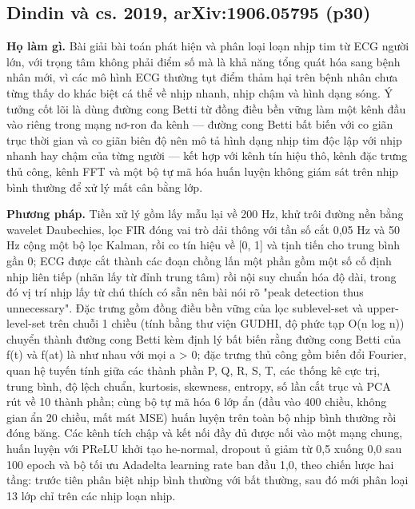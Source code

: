\documentclass[12pt,a4paper]{article}
\begin{document}
\subsection{Dindin và cs. 2019, arXiv:1906.05795 \normalfont\small (p30)}
\par\vspace{2pt}
\par\vspace{4pt}
\noindent \textbf{Họ làm gì.} Bài giải bài toán phát hiện và phân loại loạn nhịp tim từ ECG người lớn, với trọng tâm không phải điểm số mà là khả năng tổng quát hóa sang bệnh nhân mới, vì các mô hình ECG thường tụt điểm thảm hại trên bệnh nhân chưa từng thấy do khác biệt cá thể về nhịp nhanh, nhịp chậm và hình dạng sóng. Ý tưởng cốt lõi là dùng đường cong Betti từ đồng điều bền vững làm một kênh đầu vào riêng trong mạng nơ-ron đa kênh — đường cong Betti bất biến với co giãn trục thời gian và co giãn biên độ nên mô tả hình dạng nhịp tim độc lập với nhịp nhanh hay chậm của từng người — kết hợp với kênh tín hiệu thô, kênh đặc trưng thủ công, kênh FFT và một bộ tự mã hóa huấn luyện không giám sát trên nhịp bình thường để xử lý mất cân bằng lớp.\par\vspace{3pt}
\noindent \textbf{Phương pháp.} Tiền xử lý gồm lấy mẫu lại về 200 Hz, khử trôi đường nền bằng wavelet Daubechies, lọc FIR đóng vai trò dải thông với tần số cắt 0,05 Hz và 50 Hz cộng một bộ lọc Kalman, rồi co tín hiệu về [0, 1] và tịnh tiến cho trung bình gần 0; ECG được cắt thành các đoạn chồng lấn một phần gồm một số cố định nhịp liên tiếp (nhãn lấy từ đỉnh trung tâm) rồi nội suy chuẩn hóa độ dài, trong đó vị trí nhịp lấy từ chú thích có sẵn nên bài nói rõ "peak detection thus unnecessary". Đặc trưng gồm đồng điều bền vững của lọc sublevel-set và upper-level-set trên chuỗi 1 chiều (tính bằng thư viện GUDHI, độ phức tạp O(n log n)) chuyển thành đường cong Betti kèm định lý bất biến rằng đường cong Betti của f(t) và f(at) là như nhau với mọi a > 0; đặc trưng thủ công gồm biến đổi Fourier, quan hệ tuyến tính giữa các thành phần P, Q, R, S, T, các thống kê cực trị, trung bình, độ lệch chuẩn, kurtosis, skewness, entropy, số lần cắt trục và PCA rút về 10 thành phần; cùng bộ tự mã hóa 6 lớp ẩn (đầu vào 400 chiều, không gian ẩn 20 chiều, mất mát MSE) huấn luyện trên toàn bộ nhịp bình thường rồi đóng băng. Các kênh tích chập và kết nối đầy đủ được nối vào một mạng chung, huấn luyện với PReLU khởi tạo he-normal, dropout ủ giảm từ 0,5 xuống 0,0 sau 100 epoch và bộ tối ưu Adadelta learning rate ban đầu 1,0, theo chiến lược hai tầng: trước tiên phân biệt nhịp bình thường với bất thường, sau đó mới phân loại 13 lớp chỉ trên các nhịp loạn nhịp.\par\vspace{3pt}
\end{document}
